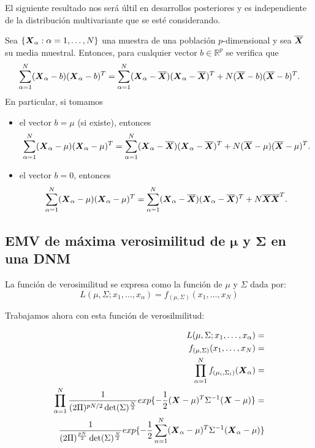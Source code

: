El siguiente resultado nos será últil en desarrollos posteriores y es independiente de la distribución multivariante que se esté considerando.

\begin{lema}
  Sea $\{\boldsymbol{X}_\alpha: \alpha = 1,\dots , N\}$ una muestra de una población \(p\)-dimensional y sea $\overline{\boldsymbol{X}}$ su media muestral. Entonces, para cualquier vector $b\in \mathbb R^p$ se verifica que
  \[
    \sum_{\alpha = 1}^N(\boldsymbol{X}_\alpha - b)(\boldsymbol{X}_\alpha - b)^T 
    = \sum_{\alpha = 1}^N(\boldsymbol{X}_\alpha - \overline{\boldsymbol{X}})(\boldsymbol{X}_\alpha - \overline{\boldsymbol{X}})^T + N(\overline{\boldsymbol{X}} - b)(\overline{\boldsymbol{X}} - b)^T.
  \]
  En particular, si tomamos
  \begin{itemize}
    \item el vector $b = \mu$ (si existe), entonces
    \[
      \sum_{\alpha = 1}^N(\boldsymbol{X}_\alpha - \mu)(\boldsymbol{X}_\alpha - \mu)^T 
      = \sum_{\alpha = 1}^N(\boldsymbol{X}_\alpha - \overline{\boldsymbol{X}})(\boldsymbol{X}_\alpha - \overline{\boldsymbol{X}})^T + N(\overline{\boldsymbol{X}} - \mu)(\overline{\boldsymbol{X}} - \mu)^T.
    \]
    \item el vector $b = 0$, entonces
    \[
      \sum_{\alpha = 1}^N(\boldsymbol{X}_\alpha - \mu)(\boldsymbol{X}_\alpha - \mu)^T 
      = \sum_{\alpha = 1}^N(\boldsymbol{X}_\alpha - \overline{\boldsymbol{X}})(\boldsymbol{X}_\alpha - \overline{\boldsymbol{X}})^T + N\overline{\boldsymbol{X}}\overline{\boldsymbol{X}}^T.
    \]
  \end{itemize}
\end{lema}


 \subsection{EMV de máxima verosimilitud de \texorpdfstring{$\boldsymbol \mu$}{mu} y \texorpdfstring{$\boldsymbol \Sigma$}{sigma} en una DNM}

 \begin{ndef}
   La función de verosimilitud se expresa como la función de $\mu$ y $\Sigma$ dada por:
   \[
 L(\mu,\Sigma;x_1,\dots,x_\alpha) = f_{(\mu,\Sigma)}(x_1,\dots,x_N)
   \]
 \end{ndef}

 Trabajamos ahora con esta función de verosilmilitud:


 \[
 \begin{aligned}
 L(\mu,\Sigma;x_1,\dots,x_\alpha) = \\
 f_{(\mu,\Sigma)}(x_1,\dots,x_N) = \\
 \prod_{\alpha = 1}^N f_{(\mu_i,\Sigma_i)}(\boldsymbol{X} _\alpha) = \\
 \prod_{\alpha = 1}^N \frac{1}{(2\Pi)^{pN/2}\det(\Sigma)^{\frac{N}{2}}} exp\{-\frac{1}{2}(\boldsymbol{X} - \mu)^T \Sigma^{-1}(\boldsymbol{X} - \mu)\} = \\
 \frac{1}{(2\Pi)^{\frac{pN}{2}} \det(\Sigma)^{\frac{N}{2}}} exp\{-\frac{1}{2}\sum_{\alpha = 1}^N (\boldsymbol{X}_\alpha - \mu)^T \Sigma^{-1} (\boldsymbol{X} _\alpha - \mu)\}
 \end{aligned}
\]

